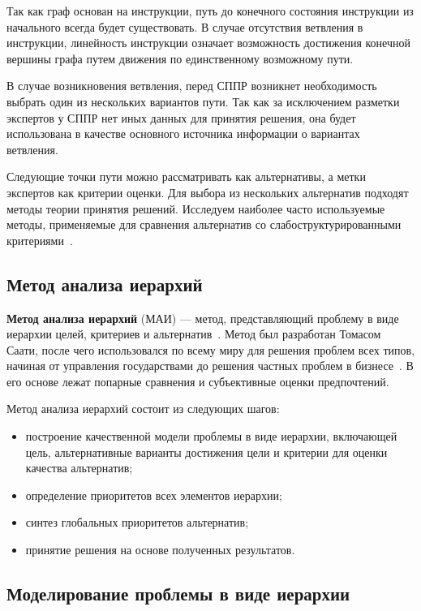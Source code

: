 Так как граф основан на инструкции, путь до конечного состояния инструкции из начального всегда будет существовать.
В случае отсутствия ветвления в инструкции, линейность инструкции означает возможность достижения конечной вершины графа путем движения по единственному возможному пути.

В случае возникновения ветвления, перед СППР возникнет необходимость выбрать один из нескольких вариантов пути.
Так как за исключением разметки экспертов у СППР нет иных данных для принятия решения, она будет использована в качестве основного источника информации о вариантах ветвления.

Следующие точки пути можно рассматривать как альтернативы, а метки экспертов как критерии оценки.
Для выбора из нескольких альтернатив подходят методы теории принятия решений.
Исследуем наиболее часто используемые методы, применяемые для сравнения альтернатив со слабоструктурированными критериями~\cite{comparison}.


\subsection{Метод анализа иерархий}

\textbf{Метод анализа иерархий} (МАИ) --- метод, представляющий проблему в виде иерархии целей, критериев и альтернатив~\cite{saaty1980ahp}.
Метод был разработан Томасом Саати, после чего использовался по всему миру для решения проблем всех типов, начиная от управления государствами до решения частных проблем в бизнесе~\cite{MAI}.
В его основе лежат попарные сравнения и субъективные оценки предпочтений.

Метод анализа иерархий состоит из следующих шагов:
\begin{itemize} 
    \item построение качественной модели проблемы в виде иерархии, включающей цель, альтернативные варианты достижения цели и критерии для оценки качества альтернатив;
    \item определение приоритетов всех элементов иерархии;
    \item синтез глобальных приоритетов альтернатив;
    \item принятие решения на основе полученных результатов.
\end{itemize}

\subsection*{Моделирование проблемы в виде иерархии}

